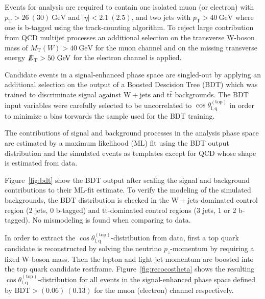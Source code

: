 \documentclass[a4paper]{jpconf}
\newcommand{\unit}[1]{\ensuremath{\mathrm{~#1}}}
\newcommand{\wjets}[0]{\mathrm{W+jets}}
\newcommand{\ttbar}[0]{\ensuremath{\mathrm{t\bar{t}}}}
\newcommand{\costheta}[0]{\cos\theta_{\mathrm{l,q}}^{\mathrm{(top)}}}
\newcommand{\pT}[0]{\ensuremath{p_\mathrm{T}}}
\newcommand{\mtw}[0]{\ensuremath{M_\mathrm{T}(W)}}
\newcommand{\met}[0]{\ensuremath{\slashed E_\mathrm{T}}}
\newcommand{\BDT}[0]{\ensuremath{\mathrm{BDT}}}
\begin{document}
Events for analysis are required to contain one isolated muon (or electron) with $\pT>26~(30)\unit{GeV}$ and $|\eta|<2.1~(2.5)$, and two jets with $\pT>40\unit{GeV}$ where one is b-tagged using the track-counting algorithm. To reject large contribution from QCD multijet processes an additional selection on the transverse W-boson mass of $\mtw>40\unit{GeV}$ for the muon channel and on the missing transverse energy $\met>50\unit{GeV}$ for the electron channel is applied. 


Candidate events in a signal-enhanced phase space are singled-out by applying an additional selection on the output of a Boosted Descision Tree (BDT) which was trained to discriminate signal against $\wjets$ and $\ttbar$ backgrounds. The BDT input variables were carefully selected to be uncorrelated to $\costheta$ in order to minimize a bias torwards the sample used for the BDT training.


The contributions of signal and background processes in the analysis phase space are estimated by a maximum likelihood (ML) fit using the BDT output distribution and the simulated events as templates except for QCD whose shape is estimated from data.


Figure~\ref{fig:bdt} show the BDT output after scaling the signal and background contributions to their ML-fit estimate. To verify the modeling of the simulated backgrounds, the BDT distribution is checked in the $\wjets$-dominated control region (2 jets, 0 b-tagged) and $\ttbar$-dominated control regions (3 jets, 1 or 2 b-tagged). No mismodeling is found when comparing to data.


In order to extract the $\costheta$-distribution from data, first a top quark candidate is reconstructed by solving the neutrino $p_{z}$-momentum by requiring a fixed W-boson mass. Then the lepton and light jet momentum are boosted into the top quark candidate restframe. Figure~\ref{fig:recocostheta} shows the resulting $\costheta$-distribution for all events in the signal-enhanced phase space defined by $\BDT>(0.06)~(0.13)$ for the muon (electron) channel respectively.
\end{document}
